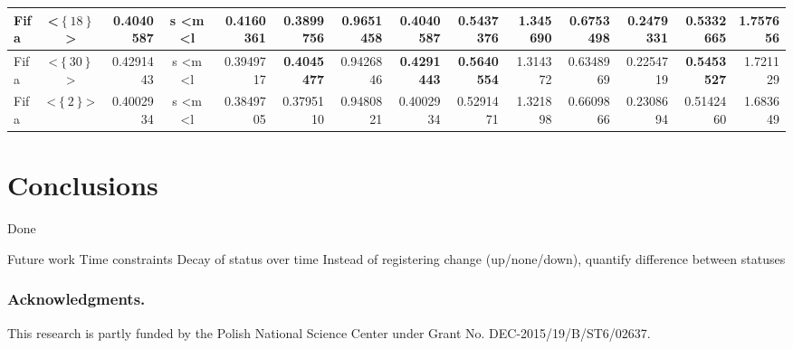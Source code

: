\documentclass[runningheads,a4paper]{llncs}
\begin{document}
\begin{table}
\begin{tabularx}{\textwidth}{l@{}c@{}R@{}c@{}R@{}R@{}R@{}R@{}R@{}R@{}R@{}R@{}R@{}R@{}}
    	    \midrule
    Fifa & \textless$\left\{\text{18}\right\}$\textgreater & 0.4040587 & s \textless m \textless l & 0.4160361 & 0.3899756 & 0.9651458 & 0.4040587 & 0.5437376 & 1.345690 & 0.6753498 & 0.2479331 & 0.5332665 & 1.757656 \\
        \midrule
    Fifa & \textless$\left\{\text{30}\right\}$\textgreater & 0.4291443 & s \textless m \textless l & 0.3949717 & \textbf{0.4045477} & 0.9426846 & \textbf{0.4291443} & \textbf{0.5640554} & 1.314372 & 0.6348969 & 0.2254719 & \textbf{0.5453527} & 1.721129 \\
        \midrule
    Fifa & \textless$\left\{\text{2}\right\}$\textgreater & 0.4002934 & s \textless m \textless l & 0.3849705 & 0.3795110 & 0.9480821 & 0.4002934 & 0.5291471 & 1.321898 & 0.6609866 & 0.2308694 & 0.5142460 & 1.683649 \\
        \bottomrule
    \end{tabularx}%
  \label{tab:results}%
\end{table}%


\section{Conclusions}
\label{sec:conclusions}
Done

Future work
Time constraints
Decay of status over time
Instead of registering change (up/none/down), quantify difference between statuses

\subsubsection*{Acknowledgments.} This research is partly funded by the Polish National Science Center under Grant No. DEC-2015/19/B/ST6/02637.



\end{document}

